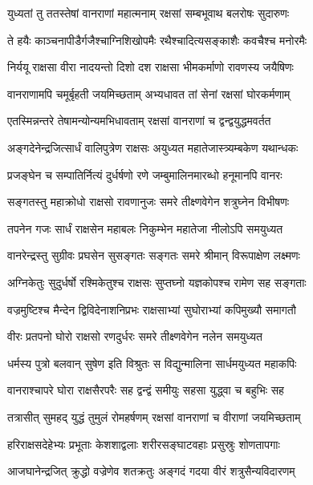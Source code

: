 
\twolineshloka
{युध्यतां तु ततस्तेषां वानराणां महात्मनाम्}
{रक्षसां सम्बभूवाथ बलरोषः सुदारुणः} %

\twolineshloka
{ते हयैः काञ्चनापीडैर्गजैश्चाग्निशिखोपमैः}
{रथैश्चादित्यसङ्काशैः कवचैश्च मनोरमैः} %

\twolineshloka
{निर्ययू राक्षसा वीरा नादयन्तो दिशो दश}
{राक्षसा भीमकर्माणो रावणस्य जयैषिणः} %

\twolineshloka
{वानराणामपि चमूर्बृहती जयमिच्छताम्}
{अभ्यधावत तां सेनां रक्षसां घोरकर्मणाम्} %

\twolineshloka
{एतस्मिन्नन्तरे तेषामन्योन्यमभिधावताम्}
{रक्षसां वानराणां च द्वन्द्वयुद्धमवर्तत} %

\twolineshloka
{अङ्गदेनेन्द्रजित्सार्धं वालिपुत्रेण राक्षसः}
{अयुध्यत महातेजास्त्र्यम्बकेण यथान्धकः} %

\twolineshloka
{प्रजङ्घेन च सम्पातिर्नित्यं दुर्धर्षणो रणे}
{जम्बुमालिनमारब्धो हनूमानपि वानरः} %

\twolineshloka
{सङ्गतस्तु महाक्रोधो राक्षसो रावणानुजः}
{समरे तीक्ष्णवेगेन शत्रुघ्नेन विभीषणः} %

\twolineshloka
{तपनेन गजः सार्धं राक्षसेन महाबलः}
{निकुम्भेन महातेजा नीलोऽपि समयुध्यत} %

\twolineshloka
{वानरेन्द्रस्तु सुग्रीवः प्रघसेन सुसङ्गतः}
{सङ्गतः समरे श्रीमान् विरूपाक्षेण लक्ष्मणः} %

\twolineshloka
{अग्निकेतुः सुदुर्धर्षो रश्मिकेतुश्च राक्षसः}
{सुप्तघ्नो यज्ञकोपश्च रामेण सह सङ्गताः} %

\twolineshloka
{वज्रमुष्टिश्च मैन्देन द्विविदेनाशनिप्रभः}
{राक्षसाभ्यां सुघोराभ्यां कपिमुख्यौ समागतौ} %

\twolineshloka
{वीरः प्रतपनो घोरो राक्षसो रणदुर्धरः}
{समरे तीक्ष्णवेगेन नलेन समयुध्यत} %

\twolineshloka
{धर्मस्य पुत्रो बलवान् सुषेण इति विश्रुतः}
{स विद्युन्मालिना सार्धमयुध्यत महाकपिः} %

\twolineshloka
{वानराश्चापरे घोरा राक्षसैरपरैः सह}
{द्वन्द्वं समीयुः सहसा युद्ध्वा च बहुभिः सह} %

\twolineshloka
{तत्रासीत् सुमहद् युद्धं तुमुलं रोमहर्षणम्}
{रक्षसां वानराणां च वीराणां जयमिच्छताम्} %

\twolineshloka
{हरिराक्षसदेहेभ्यः प्रभूताः केशशाद्वलाः}
{शरीरसङ्घाटवहाः प्रसुस्रुः शोणतापगाः} %

\twolineshloka
{आजघानेन्द्रजित् क्रुद्धो वज्रेणेव शतक्रतुः}
{अङ्गदं गदया वीरं शत्रुसैन्यविदारणम्} %

